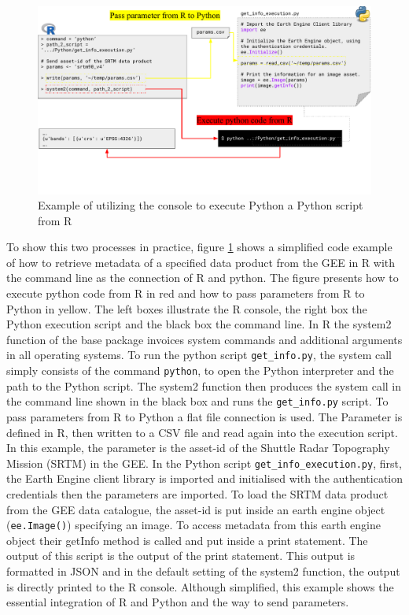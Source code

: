 \begin{center}
	\begin{figure}[h]
		\begin{center}
			\includegraphics[width=15cm]{images/concole_connection.pdf}
			\caption{Example of utilizing the console to execute Python a Python script from R}
			\label{consoleConnection}			
		\end{center}
	\end{figure}
\end{center}


To show this two processes in practice, figure \ref{consoleConnection} shows a simplified code example of how to retrieve metadata of a specified data product from the GEE in R with the command line as the connection of R and python. The figure presents how to execute python code from R in red and how to pass parameters from R to Python in yellow. The left boxes illustrate the R console, the right box the Python execution script and the black box the command line.
In R the system2 function of the base package invoices system commands and additional arguments in all operating systems. 
To run the python script \texttt{get\_info.py}, the system call simply consists of the command \texttt{python}, to open the Python interpreter and the path to the Python script. The system2 function then produces the system call in the command line shown in the black box and runs the \texttt{get\_info.py} script. To pass parameters from R to Python a flat file connection is used. The Parameter is defined in R, then written to a CSV file and read again into the execution script. In this example, the parameter is the asset-id of the Shuttle Radar Topography Mission (SRTM) in the GEE. 
In the Python script \texttt{get\_info\_execution.py}, first, the Earth Engine client library is imported and initialised with the authentication credentials then the parameters are imported. To load the SRTM data product from the GEE data catalogue, the asset-id is put inside an earth engine object (\texttt{ee.Image()}) specifying an image. To access metadata from this earth engine object their getInfo method is called and put inside a print statement. The output of this script is the output of the print statement. This output is formatted in JSON and in the default setting of the system2 function, the output is directly printed to the R console. Although simplified, this example shows the essential integration of R and Python and the way to send parameters. 

